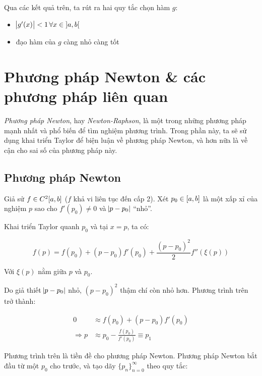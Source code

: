 \documentclass[../../Lectures]{subfiles}
\begin{document}
Qua các kết quả trên, ta rút ra hai quy tắc chọn hàm \(g\):

\begin{itemize}
    \item \(\abs{g'(x)} < 1 \, \forall x \in \interval[open]{a}{b}\)
    \item đạo hàm của \(g\) càng nhỏ càng tốt
\end{itemize}



\section{Phương pháp Newton \& các phương pháp liên quan}

\emph{Phương pháp Newton}, hay \emph{Newton-Raphson}, là một trong những phương
pháp mạnh nhất và phổ biến để tìm nghiệm phương trình. Trong phần này, ta sẽ sử
dụng khai triển Taylor để biện luận về phương pháp Newton, và hơn nữa là về cận
cho sai số của phương pháp này.

\subsection{Phương pháp Newton}\label{sec:newton_method}

Giả sử \(f \in C^2\interval{a}{b}\) (\(f\) khả vi liên tục đến cấp 2). Xét \(p_0
\in \interval{a}{b}\) là một xấp xỉ của nghiệm \(p\) sao cho \(f'(p_0) \neq 0\)
và \(\abs{p - p_0}\) ``nhỏ''.

Khai triển Taylor quanh \(p_0\) và tại \(x = p\), ta có:

\[f(p) = f(p_0) + (p - p_0) f'(p_0) + \frac{(p - p_0)^2}{2} f''(\xi(p))\]

Với \(\xi(p)\) nằm giữa \(p\) và \(p_0\).

Do giả thiết \(\abs{p - p_0}\) nhỏ, \((p - p_0)^2\) thậm chí còn nhỏ hơn. Phương
trình trên trở thành:

\begin{align*}
                0 & \approx f(p_0) + (p - p_0) f'(p_0) \\
    \Rightarrow	p & \approx p_0 - \frac{f(p_0)}{f'(p_0)} \equiv p_1
\end{align*}

Phương trình trên là tiền đề cho phương pháp Newton. Phương pháp Newton bắt đầu
từ một \(p_0\) cho trước, và tạo dãy \(\{p_n\}_{n = 0}^\infty\) theo quy tắc:
\end{document}
